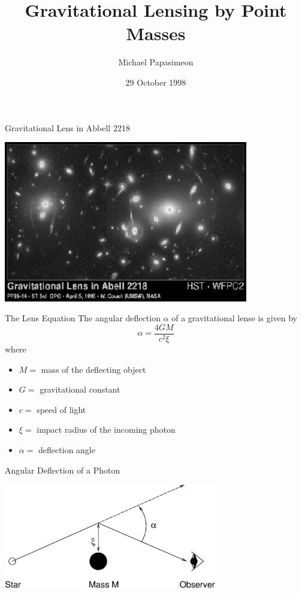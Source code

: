 \documentclass[aspectratio=1610,xcolor=dvipsnames,t]{beamer}
\title[Gravitational Lensing]{Gravitational Lensing by Point Masses}
\author{Michael Papasimeon}
\date{29 October 1998}
\begin{document}
\maketitle

\begin{frame}{Gravitational Lens in Abbell 2218} 
    \begin{center}
        \includegraphics[width=0.8\textwidth]{images/hubble.eps}
    \end{center}
\end{frame} 

\begin{frame}{The Lens Equation}
    The angular deflection $\alpha$ of a gravitational lense is given by
    \begin{equation}    
        \alpha = \frac{4GM}{c^2 \xi}
    \end{equation}
    where
    \begin{itemize}
        \item $M = $ mass of the deflecting object
        \item $G = $ gravitational constant
        \item $c = $ speed of light
        \item $\xi = $ impact radius of the incoming photon
        \item $\alpha = $ deflection angle
    \end{itemize}
\end{frame} 

\begin{frame}{Angular Deflection of a Photon} 
    \begin{center}
        \includegraphics[width=0.7\textwidth]{images/gldiag.eps}
    \end{center}
\end{frame} 
\end{document}
